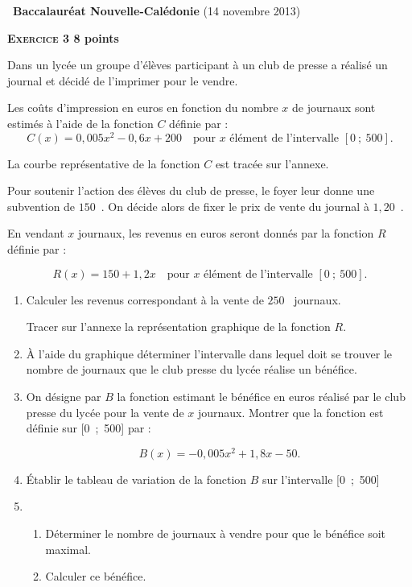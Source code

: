 \documentclass[10pt]{article}
\newcommand{\euro}{\eurologo{}}
\begin{document}
\footnotesize

\setlength\parindent{0mm}
\pagestyle{fancy}
\thispagestyle{empty}
\begin{center}{\large\decofourleft~\textbf{Baccalauréat Nouvelle-Calédonie} (14 novembre 2013)~\decofourright}
\end{center}

\textbf{\textsc{Exercice 3} \hfill 8 points}

\medskip

Dans un lycée un groupe d’élèves participant à un club de presse a réalisé un journal et décidé de l’imprimer pour le vendre.

Les coûts d’impression en euros en fonction du nombre $x$  de journaux sont estimés à l’aide de la fonction $C$ définie par :
\[C(x) =  0,005x^2 - 0,6x +  200\quad  \text{pour $x$ élément de l’intervalle } [0~;~500].\]

La courbe représentative de la fonction $C$ est tracée sur l’annexe.


Pour soutenir l’action des élèves du club de presse, le foyer leur donne une subvention de $150$~\euro. On décide alors de fixer le prix de vente du journal à $1,20$~\euro.

En vendant $x$  journaux, les revenus en euros seront donnés  par la fonction $R$ définie par :

\[R(x) =  150 + 1,2x\quad  \text{pour $x$ élément de l’intervalle } [0~;~500].\]

\begin{enumerate}
\item Calculer les revenus correspondant à la vente de $250$~ journaux.

Tracer sur l'annexe la représentation graphique de la fonction $R$.
\item  À l'aide du graphique déterminer l'intervalle dans lequel doit se trouver le nombre de journaux que le club presse du lycée réalise un bénéfice.
\item On désigne par $B$ la fonction estimant le bénéfice en euros réalisé par le club presse du lycée pour la vente de $x$  journaux. Montrer que la fonction est définie sur [0~;~500] par :

\[B(x) =  - 0,005x^2 + 1,8x -  50.\]

\item \'Etablir le tableau de variation de la fonction $B$ sur l'intervalle [0~;~500]
\item
	\begin{enumerate}
		\item Déterminer le nombre de journaux à vendre pour que le bénéfice soit maximal.
		\item Calculer ce bénéfice.
	\end{enumerate}
\end{enumerate}
\end{document}
